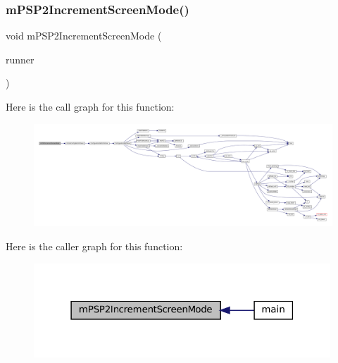 \mbox{\label{psp2-context_8h_a88df7b81ae33955caa66f8f0516c8a2a}} 
\subsubsection{\texorpdfstring{m\+P\+S\+P2\+Increment\+Screen\+Mode()}{mPSP2IncrementScreenMode()}}
{\footnotesize\ttfamily void m\+P\+S\+P2\+Increment\+Screen\+Mode (\begin{DoxyParamCaption}\item[{struct \mbox{\hyperlink{structm_g_u_i_runner}{m\+G\+U\+I\+Runner}} $\ast$}]{runner }\end{DoxyParamCaption})}

Here is the call graph for this function\+:
\nopagebreak
\begin{figure}[H]
\begin{center}
\leavevmode
\includegraphics[width=350pt]{psp2-context_8h_a88df7b81ae33955caa66f8f0516c8a2a_cgraph}
\end{center}
\end{figure}
Here is the caller graph for this function\+:
\nopagebreak
\begin{figure}[H]
\begin{center}
\leavevmode
\includegraphics[width=316pt]{psp2-context_8h_a88df7b81ae33955caa66f8f0516c8a2a_icgraph}
\end{center}
\end{figure}
\mbox{\label{psp2-context_8h_a6d1428d32dd856760fa94b6a08e54ab2}} 
